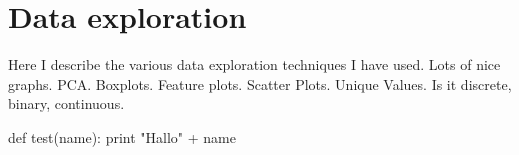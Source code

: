 \chapter{Data exploration}
Here I describe the various data exploration techniques I have used. Lots of nice graphs. PCA. Boxplots. Feature plots. Scatter Plots. Unique Values. Is it discrete, binary, continuous.

\begin{python}[moreemph={[4]42},caption={Simple python example No. 1},label=ex1]
def test(name):
    print "Hallo" + name
\end{python}
